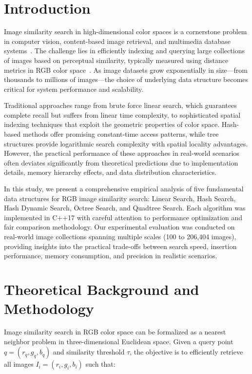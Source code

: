 \documentclass{sbc2023}
\begin{document}
\section{Introduction}
\label{sec:intro}

Image similarity search in high-dimensional color spaces is a cornerstone problem in computer vision, content-based image retrieval, and multimedia database systems~\cite{9035427}. The challenge lies in efficiently indexing and querying large collections of images based on perceptual similarity, typically measured using distance metrics in RGB color space~\cite{8394553}. As image datasets grow exponentially in size—from thousands to millions of images—the choice of underlying data structure becomes critical for system performance and scalability.

Traditional approaches range from brute force linear search, which guarantees complete recall but suffers from linear time complexity, to sophisticated spatial indexing techniques that exploit the geometric properties of color space. Hash-based methods offer promising constant-time access patterns, while tree structures provide logarithmic search complexity with spatial locality advantages. However, the practical performance of these approaches in real-world scenarios often deviates significantly from theoretical predictions due to implementation details, memory hierarchy effects, and data distribution characteristics.

In this study, we present a comprehensive empirical analysis of five fundamental data structures for RGB image similarity search: Linear Search, Hash Search, Hash Dynamic Search, Octree Search, and Quadtree Search. Each algorithm was implemented in C++17 with careful attention to performance optimization and fair comparison methodology. Our experimental evaluation was conducted on real-world image collections spanning multiple scales (100 to 206,404 images), providing insights into the practical trade-offs between search speed, insertion performance, memory consumption, and precision in realistic scenarios.

\section{Theoretical Background and Methodology}
\label{sec:methodology}

Image similarity search in RGB color space can be formalized as a nearest neighbor problem in three-dimensional Euclidean space. Given a query point $q = (r_q, g_q, b_q)$ and similarity threshold $\tau$, the objective is to efficiently retrieve all images $I_i = (r_i, g_i, b_i)$ such that:
\end{document}
